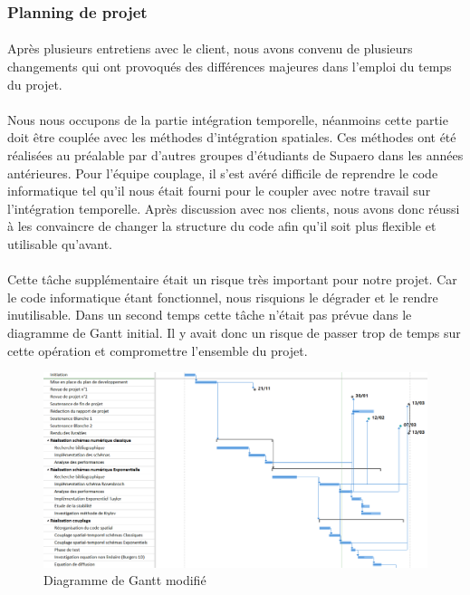     \subsubsection{Planning de projet}
        \paragraph{}
        Après plusieurs entretiens avec le client, nous avons convenu de plusieurs changements qui ont provoqués des différences majeures dans l'emploi du temps du projet. 

        \paragraph{}
        Nous nous occupons de la partie intégration temporelle, néanmoins cette partie doit être couplée avec les méthodes d'intégration spatiales. Ces méthodes ont été réalisées au préalable par d'autres groupes d'étudiants de Supaero dans les années antérieures. Pour l'équipe couplage, il s'est avéré difficile de reprendre le code informatique tel qu'il nous était fourni pour le coupler avec notre travail sur l'intégration temporelle. Après discussion avec nos clients, nous avons donc réussi à les convaincre de changer la structure du code afin qu'il soit plus flexible et utilisable qu'avant.

        \paragraph{}
        Cette tâche supplémentaire était un risque très important pour notre projet. Car le code informatique étant fonctionnel, nous risquions le dégrader et le rendre inutilisable. Dans un second temps cette tâche n'était pas prévue dans le diagramme de Gantt initial. Il y avait donc un risque de passer trop de temps sur cette opération et compromettre l'ensemble du projet.
        \begin{figure}
            \centering
            \includegraphics[width=\textwidth]{images/gantt_2.png}
            \caption{Diagramme de Gantt modifié} 
            \label{fig:Gantt modifié}
        \end{figure}

